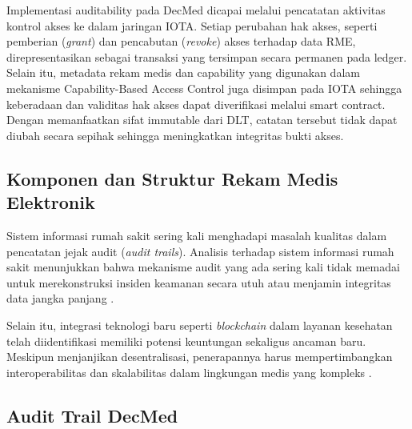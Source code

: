 Implementasi auditability pada DecMed dicapai melalui pencatatan aktivitas kontrol akses ke dalam jaringan IOTA. Setiap perubahan hak akses, seperti pemberian (\textit{grant}) dan pencabutan (\textit{revoke}) akses terhadap data RME, direpresentasikan sebagai transaksi yang tersimpan secara permanen pada ledger. Selain itu, metadata rekam medis dan capability yang digunakan dalam mekanisme Capability-Based Access Control juga disimpan pada IOTA sehingga keberadaan dan validitas hak akses dapat diverifikasi melalui smart contract. Dengan memanfaatkan sifat immutable dari DLT, catatan tersebut tidak dapat diubah secara sepihak sehingga meningkatkan integritas bukti akses.


\subsection{Komponen dan Struktur Rekam Medis Elektronik}

Sistem informasi rumah sakit sering kali menghadapi masalah kualitas dalam pencatatan jejak audit (\textit{audit trails}). Analisis terhadap sistem informasi rumah sakit menunjukkan bahwa mekanisme audit yang ada sering kali tidak memadai untuk merekonstruksi insiden keamanan secara utuh atau menjamin integritas data jangka panjang \cite{6}.

Selain itu, integrasi teknologi baru seperti \textit{blockchain} dalam layanan kesehatan telah diidentifikasi memiliki potensi keuntungan sekaligus ancaman baru. Meskipun menjanjikan desentralisasi, penerapannya harus mempertimbangkan interoperabilitas dan skalabilitas dalam lingkungan medis yang kompleks \cite{1}.



\subsection{Audit Trail DecMed}

